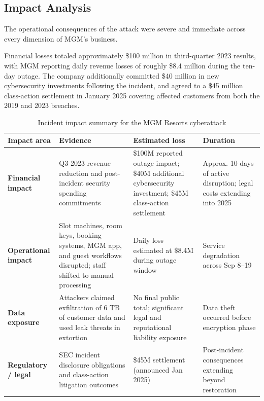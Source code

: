 \subsection{Impact Analysis}

The operational consequences of the attack were severe and immediate across every dimension of MGM's business.

Financial losses totaled approximately \$100 million in third-quarter 2023 results, with MGM reporting daily revenue losses of roughly \$8.4 million during the ten-day outage. The company additionally committed \$40 million in new cybersecurity investments following the incident, and agreed to a \$45 million class-action settlement in January 2025 covering affected customers from both the 2019 and 2023 breaches.

\begin{table}[htbp]
\centering
\small
\setlength{\tabcolsep}{5pt}
\begin{tabularx}{\textwidth}{>{\bfseries}p{2.8cm} X p{3.05cm} p{2.45cm}}
\toprule
Impact area & Evidence & Estimated loss & Duration \\
\midrule
Financial impact & Q3 2023 revenue reduction and post-incident security spending commitments & \$100M reported outage impact; \$40M additional cybersecurity investment; \$45M class-action settlement & Approx. 10 days of active disruption; legal costs extending into 2025 \\

Operational impact & Slot machines, room keys, booking systems, MGM app, and guest workflows disrupted; staff shifted to manual processing & Daily loss estimated at \$8.4M during outage window & Service degradation across Sep 8--19 \\

Data exposure & Attackers claimed exfiltration of 6 TB of customer data and used leak threats in extortion & No final public total; significant legal and reputational liability exposure & Data theft occurred before encryption phase \\

Regulatory / legal & SEC incident disclosure obligations and class-action litigation outcomes & \$45M settlement (announced Jan 2025) & Post-incident consequences extending beyond restoration \\
\bottomrule
\end{tabularx}
\caption{Incident impact summary for the MGM Resorts cyberattack}
\label{tab:mgm-incident-impact-summary}
\end{table}

